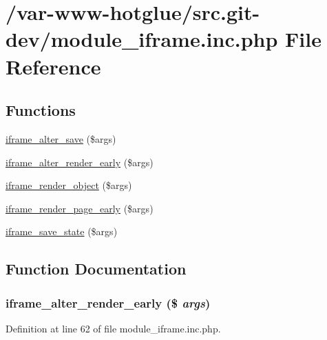 \hypertarget{module__iframe_8inc_8php}{
\section{/var-\/www-\/hotglue/src.git-\/dev/module\_\-iframe.inc.php File Reference}
\label{module__iframe_8inc_8php}
}
\subsection*{Functions}
\begin{DoxyCompactItemize}
\item 
\hyperlink{module__iframe_8inc_8php_a2db93d83522681e256287e019fe40abc}{iframe\_\-alter\_\-save} (\$args)
\item 
\hyperlink{module__iframe_8inc_8php_a7a5d09a45f06d9fd866f3c7679c14db2}{iframe\_\-alter\_\-render\_\-early} (\$args)
\item 
\hyperlink{module__iframe_8inc_8php_a40856482f79fb837bc538e8eed66aff4}{iframe\_\-render\_\-object} (\$args)
\item 
\hyperlink{module__iframe_8inc_8php_ad4d8fd8256a19beb570193c2886659e5}{iframe\_\-render\_\-page\_\-early} (\$args)
\item 
\hyperlink{module__iframe_8inc_8php_a3034fcc475334b511b91932918fcfe57}{iframe\_\-save\_\-state} (\$args)
\end{DoxyCompactItemize}


\subsection{Function Documentation}
\hypertarget{module__iframe_8inc_8php_a7a5d09a45f06d9fd866f3c7679c14db2}{
\subsubsection[{iframe\_\-alter\_\-render\_\-early}]{\setlength{\rightskip}{0pt plus 5cm}iframe\_\-alter\_\-render\_\-early (\$ {\em args})}}
\label{module__iframe_8inc_8php_a7a5d09a45f06d9fd866f3c7679c14db2}


Definition at line 62 of file module\_\-iframe.inc.php.

